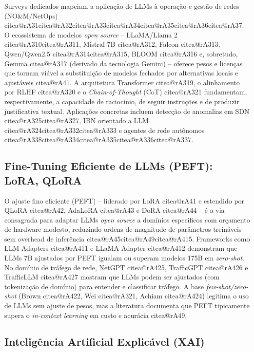 \documentclass[12pt,a4paper]{article}
\makeatletter
\newcommand{\citea}[1]{\begingroup\edef\@currentlabel{\csname citea@#1\endcsname}\@currentlabel\endgroup}
\makeatother
\begin{document}
Surveys dedicados mapeiam a aplicação de LLMs à operação e gestão de redes
(NO\&M/NetOps) \citea{rA31}\citea{rA32}\citea{rA33}\citea{rA34}\citea{rA35}\citea{rA36}\citea{rA37}. O ecossistema de modelos
\textit{open source} -- LLaMA/Llama 2 \citea{rA310}\citea{rA311}, Mistral 7B \citea{rA312}, Falcon
\citea{rA313}, Qwen/Qwen2.5 \citea{rA314}\citea{rA315}, BLOOM \citea{rA316} e, sobretudo, Gemma
\citea{rA317} (derivado da tecnologia Gemini) -- oferece pesos e licenças que tornam
viável a substituição de modelos fechados por alternativas locais e ajustáveis
\citea{rA41}. A arquitetura Transformer \citea{rA319}, o alinhamento por RLHF \citea{rA320} e o
\textit{Chain-of-Thought} (CoT) \citea{rA321} fundamentam, respectivamente, a
capacidade de raciocínio, de seguir instruções e de produzir justificativa
textual. Aplicações concretas incluem detecção de anomalias em SDN
\citea{rA325}\citea{rA327}, IBN orientado a LLM \citea{rA324}\citea{rA332}\citea{rA333} e agentes de rede
autônomos \citea{rA338}\citea{rA334}\citea{rA335}\citea{rA336}\citea{rA337}.

\subsection{Fine-Tuning Eficiente de LLMs (PEFT): LoRA, QLoRA}
\label{sec:peft}

O ajuste fino eficiente (PEFT) -- liderado por LoRA \citea{rA41} e estendido por QLoRA
\citea{rA42}, AdaLoRA \citea{rA43} e DoRA \citea{rA44} -- é a via consagrada para adaptar LLMs
\textit{open source} a domínios específicos com orçamento de hardware modesto,
reduzindo ordens de magnitude de parâmetros treináveis sem overhead de
inferência \citea{rA45}\citea{rA49}\citea{rA415}. Frameworks como LLM-Adapters \citea{rA411} e
LLaMA-Adapter \citea{rA412} demonstram que LLMs 7B ajustados por PEFT igualam ou
superam modelos 175B em \textit{zero-shot}. No domínio de tráfego de rede,
NetGPT \citea{rA425}, TrafficGPT \citea{rA426} e TrafficLLM \citea{rA427} mostram que LLMs podem ser
ajustados (com tokenização de domínio) para entender e classificar tráfego. A
base \textit{few-shot/zero-shot} (Brown \citea{rA422}, Wei \citea{rA321}, Achiam \citea{rA424})
legitima o uso de LLMs sem ajuste de pesos, mas a literatura documenta que
PEFT tipicamente supera o \textit{in-context learning} em custo e acurácia
\citea{rA49}.

\subsection{Inteligência Artificial Explicável (XAI)}
\label{sec:xai}
\end{document}
